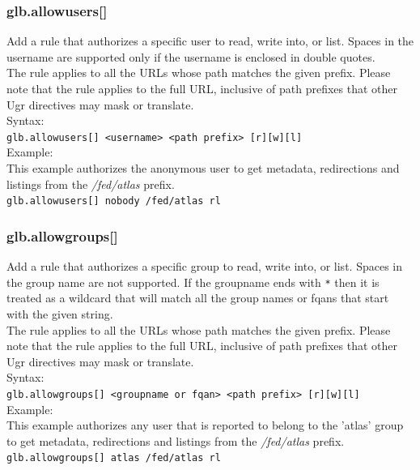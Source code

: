 \documentclass[12pt]{article} %
\begin{document}
\subsubsection{glb.allowusers[]}
Add a rule that authorizes a specific user to read, write into, or list. Spaces in the username are supported only if the username is enclosed in double quotes.\\
The rule applies to all the URLs whose path matches the given prefix. Please note that the rule applies to the full URL, inclusive of path prefixes that other Ugr directives may mask or translate.\\
Syntax:\\
\lstinline"glb.allowusers[] <username> <path prefix> [r][w][l]" \\

Example:\\
This example authorizes the anonymous user to get metadata, redirections and listings from the \textit{/fed/atlas} prefix.\\
\lstinline"glb.allowusers[] nobody /fed/atlas rl" \\

\subsubsection{glb.allowgroups[]}
Add a rule that authorizes a specific group to read, write into, or list. Spaces in the group name are not supported.
If the groupname ends with \lstinline"*" then it is treated as a wildcard that will match all the group names or fqans that start with the given string.\\
The rule applies to all the URLs whose path matches the given prefix. Please note that the rule applies to the full URL, inclusive of path prefixes that other Ugr directives may mask or translate.\\
Syntax:\\
\lstinline"glb.allowgroups[] <groupname or fqan> <path prefix> [r][w][l]" \\

Example:\\
This example authorizes any user that is reported to belong to the 'atlas' group to get metadata, redirections and listings from
the \textit{/fed/atlas} prefix.\\
\lstinline"glb.allowgroups[] atlas /fed/atlas rl" \\
\end{document}
